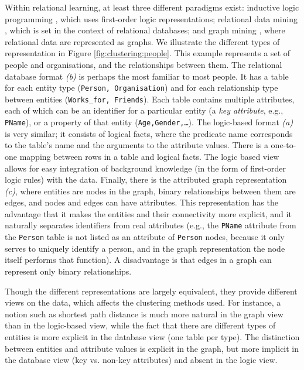 Within relational learning, at least three different paradigms exist: inductive logic programming \cite{MuggletonR94}, which uses first-order logic representations; relational data mining \cite{DzeroskiB04}, which is set in the context of relational databases; and graph mining \cite{Cook2006}, where relational data are represented as graphs.
We illustrate the different types of representation in Figure \ref{fig:clustering:people}.
This example represents a set of people and organisations, and the relationships between them.
The relational database format \textit{(b)} is perhaps the most familiar to most people.
It has a table for each entity type (\texttt{Person, Organisation}) and for each relationship type between entities (\texttt{Works\_for, Friends}).
Each table contains multiple attributes, each of which can be an identifier for a particular entity (a \textit{key attribute}, e.g., \texttt{PName}), or a property of that entity (\texttt{Age,Gender,\ldots}).
The logic-based format \textit{(a)} is very similar; it consists of logical facts, where the predicate name corresponds to the table’s name and the arguments to the attribute values.
There is a one-to-one mapping between rows in a table and logical facts.
The logic based view allows for easy integration of background knowledge (in the form of first-order logic rules) with the data.
Finally, there is the attributed graph representation \textit{(c)}, where entities are nodes in the graph, binary relationships between them are edges, and nodes and edges can have attributes.
This representation has the advantage that it makes the entities and their connectivity more explicit, and it naturally separates identifiers from real attributes (e.g., the \texttt{PName} attribute from the \texttt{Person} table is not listed as an attribute of \texttt{Person} nodes, because it only serves to uniquely identify a person, and in the graph representation the node itself performs that function).
A disadvantage is that edges in a graph can represent only binary relationships.


Though the different representations are largely equivalent, they provide different views on the data, which affects the clustering methods used.
For instance, a notion such as shortest path distance is much more natural in the graph view than in the logic-based view, while the fact that there are  different types of entities is more explicit in the database view (one table per type).
The distinction between entities and attribute values is explicit in the graph, but more implicit in the database view (key vs. non-key attributes) and absent in the logic view.



